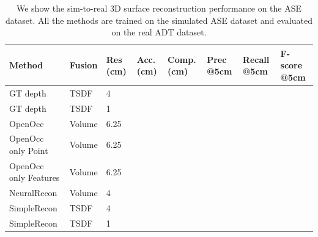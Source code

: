 \begin{table}[]
\centering
\small
\begin{tabular}{|p{2cm}|l|p{1cm}|p{1cm}|p{1cm}|p{1cm}|p{1cm}|p{1.1cm}|}
\hline
Method     & Fusion        & Res (cm) & Acc. (cm) & Comp. (cm) & Prec @5cm & Recall @5cm & F-score @5cm\\ \hline
GT depth   & TSDF       & 4                     &                 &                   &          &       &    \\ \hline
GT depth   & TSDF        & 1                     &                 &                    &          &       &    \\ \hline
OpenOcc & Volume        & 6.25                     &                 &                    &          &      &    \\ \hline
OpenOcc \newline only Point & Volume        & 6.25                    &                 &                    &          &       &    \\ \hline
OpenOcc \newline only Features & Volume        & 6.25                    &                 &                    &          &       &    \\ \hline
NeuralRecon & Volume          & 4                     &                 &                   &          &       &    \\ \hline
SimpleRecon & TSDF          & 4                     &                 &                   &          &       &    \\ \hline
SimpleRecon & TSDF          & 1                     &                 &                   &          &       &    \\ \hline

\end{tabular}
\caption{We show the sim-to-real 3D surface reconstruction performance on the ASE dataset. All the methods are trained on the simulated ASE dataset and evaluated on the real ADT dataset.}
\end{table}

